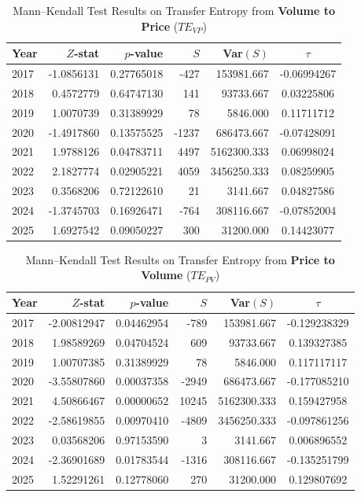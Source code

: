 \documentclass{elsarticle}
\def\rightarrow{}%
\begin{document}
\begin{table}[H]
  \caption{Mann--Kendall Test Results on Transfer Entropy from \textbf{Volume to Price} ($TE_{V \rightarrow P}$)}
  \label{tab:MK_Vol2ValTE}
  \centering
  \begin{tabular}{lrrrrc}
    \hline
    Year & $Z$-stat & $p$-value & $S$ & Var$(S)$ & $\tau$ \\
    \hline
    2017 & -1.0856131 & 0.27765018 & -427  & 153981.667 & -0.06994267 \\
    2018 &  0.4572779 & 0.64747130 &  141  &  93733.667 &  0.03225806 \\
    2019 &  1.0070739 & 0.31389929 &   78  &   5846.000 &  0.11711712 \\
    2020 & -1.4917860 & 0.13575525 & -1237 & 686473.667 & -0.07428091 \\
    2021 &  1.9788126 & 0.04783711 &  4497 & 5162300.333 &  0.06998024 \\
    2022 &  2.1827774 & 0.02905221 &  4059 & 3456250.333 &  0.08259905 \\
    2023 &  0.3568206 & 0.72122610 &    21 &   3141.667 &  0.04827586 \\
    2024 & -1.3745703 & 0.16926471 &  -764 &  308116.667 & -0.07852004 \\
    2025 &  1.6927542 & 0.09050227 &   300 &   31200.000 &  0.14423077 \\
    \hline
  \end{tabular}
\end{table}

\begin{table}[H]
  \caption{Mann--Kendall Test Results on Transfer Entropy from \textbf{Price to Volume} ($TE_{P \rightarrow V}$)}
  \label{tab:MK_Val2VolTE}
  \centering
  \begin{tabular}{lrrrrc}
    \hline
    Year & $Z$-stat & $p$-value & $S$ & Var$(S)$ & $\tau$ \\
    \hline
    2017 & -2.00812947 & 0.04462954 &  -789 & 153981.667 & -0.129238329 \\
    2018 &  1.98589269 & 0.04704524 &   609 &  93733.667 &  0.139327385 \\
    2019 &  1.00707385 & 0.31389929 &    78 &   5846.000 &  0.117117117 \\
    2020 & -3.55807860 & 0.00037358 & -2949 & 686473.667 & -0.177085210 \\
    2021 &  4.50866467 & 0.00000652 & 10245 & 5162300.333 &  0.159427958 \\
    2022 & -2.58619855 & 0.00970410 & -4809 & 3456250.333 & -0.097861256 \\
    2023 &  0.03568206 & 0.97153590 &     3 &   3141.667 &  0.006896552 \\
    2024 & -2.36901689 & 0.01783544 & -1316 &  308116.667 & -0.135251799 \\
    2025 &  1.52291261 & 0.12778060 &   270 &   31200.000 &  0.129807692 \\
    \hline
  \end{tabular}
\end{table}
\end{document}
